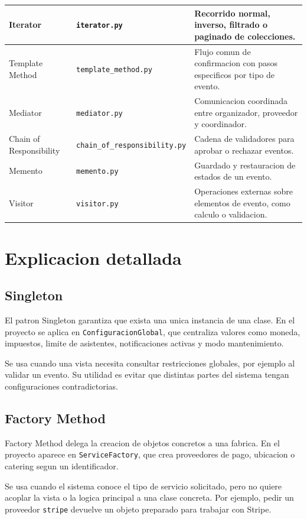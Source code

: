 \documentclass[12pt,a4paper]{article}
\begin{document}
\begin{longtable}{|p{3.3cm}|p{4cm}|p{7cm}|}
\hline
Iterator & \texttt{iterator.py} & Recorrido normal, inverso, filtrado o paginado de colecciones. \\
\hline
Template Method & \texttt{template\_method.py} & Flujo comun de confirmacion con pasos especificos por tipo de evento. \\
\hline
Mediator & \texttt{mediator.py} & Comunicacion coordinada entre organizador, proveedor y coordinador. \\
\hline
Chain of Responsibility & \texttt{chain\_of\_responsibility.py} & Cadena de validadores para aprobar o rechazar eventos. \\
\hline
Memento & \texttt{memento.py} & Guardado y restauracion de estados de un evento. \\
\hline
Visitor & \texttt{visitor.py} & Operaciones externas sobre elementos de evento, como calculo o validacion. \\
\hline
\end{longtable}

\section{Explicacion detallada}

\subsection{Singleton}

El patron Singleton garantiza que exista una unica instancia de una clase. En el proyecto se aplica en \texttt{ConfiguracionGlobal}, que centraliza valores como moneda, impuestos, limite de asistentes, notificaciones activas y modo mantenimiento.

Se usa cuando una vista necesita consultar restricciones globales, por ejemplo al validar un evento. Su utilidad es evitar que distintas partes del sistema tengan configuraciones contradictorias.

\subsection{Factory Method}

Factory Method delega la creacion de objetos concretos a una fabrica. En el proyecto aparece en \texttt{ServiceFactory}, que crea proveedores de pago, ubicacion o catering segun un identificador.

Se usa cuando el sistema conoce el tipo de servicio solicitado, pero no quiere acoplar la vista o la logica principal a una clase concreta. Por ejemplo, pedir un proveedor \texttt{stripe} devuelve un objeto preparado para trabajar con Stripe.
\end{document}
